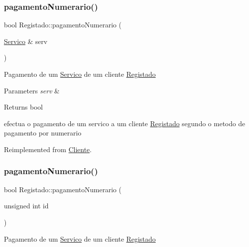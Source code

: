 \subsubsection{\texorpdfstring{pagamento\+Numerario()}{pagamentoNumerario()}\hspace{0.1cm}{\footnotesize\ttfamily [1/2]}}
{\footnotesize\ttfamily bool Registado\+::pagamento\+Numerario (\begin{DoxyParamCaption}\item[{\hyperlink{class_servico}{Servico} \&}]{serv }\end{DoxyParamCaption})\hspace{0.3cm}{\ttfamily [virtual]}}

Pagamento de um \hyperlink{class_servico}{Servico} de um cliente \hyperlink{class_registado}{Registado}


\begin{DoxyParams}{Parameters}
{\em serv} & \\
\hline
\end{DoxyParams}
\begin{DoxyReturn}{Returns}
bool
\end{DoxyReturn}
efectua o pagamento de um servico a um cliente \hyperlink{class_registado}{Registado} segundo o metodo de pagamento por numerario 

Reimplemented from \hyperlink{class_cliente_a68646846a80de5cdcb61b1f8a13e4fb8}{Cliente}.

\hypertarget{class_registado_a16a6ec63ed53fd4b6ebb1105ae5812d7}{}\label{class_registado_a16a6ec63ed53fd4b6ebb1105ae5812d7} 
\subsubsection{\texorpdfstring{pagamento\+Numerario()}{pagamentoNumerario()}\hspace{0.1cm}{\footnotesize\ttfamily [2/2]}}
{\footnotesize\ttfamily bool Registado\+::pagamento\+Numerario (\begin{DoxyParamCaption}\item[{unsigned int}]{id }\end{DoxyParamCaption})\hspace{0.3cm}{\ttfamily [virtual]}}

Pagamento de um \hyperlink{class_servico}{Servico} de um cliente \hyperlink{class_registado}{Registado}


